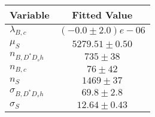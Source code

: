 \begin{tabular}[t]{lc}
\hline
Variable &Fitted Value\\
\hline\hline
$\lambda_{B,c}$&$(-0.0\pm2.0)e-06$\\
\hline
$\mu_S$&$5279.51\pm0.50$\\
\hline
$n_{B, D^* D_s h}$&$735\pm38$\\
\hline
$n_{B,c}$&$76\pm42$\\
\hline
$n_S$&$1469\pm37$\\
\hline
$\sigma_{B, D^* D_s h}$&$69.8\pm2.8$\\
\hline
$\sigma_S$&$12.64\pm0.43$\\
\hline
\end{tabular}
